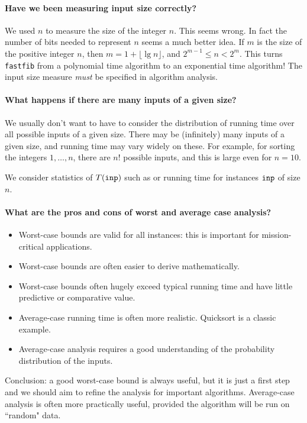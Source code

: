 \paragraph{Have we been measuring input size correctly?}

We used $n$ to measure the size of the integer $n$. This seems wrong. In fact the number of bits needed to represent $n$ seems a much better 
idea. If $m$ is the size of the positive integer $n$, then $m = 1+\lfloor\lg n\rfloor$, and $2^{m-1} \leq n < 2^m$.
This turns \texttt{fastfib} from a polynomial time algorithm to an exponential time algorithm! The input size measure \emph{must} be specified in algorithm analysis.



\paragraph{What happens if there are many inputs of a given size?}

We usually don't want to have to consider the distribution of
running time over all possible inputs of a given size. There may be (infinitely)
many inputs of a given size, and running time may vary widely on these. 
For example, for sorting the integers $1, \dots, n$, there are $n!$ possible inputs, and this is large even for $n=10$.

We consider statistics of $T(\operatorname{\text{\texttt{inp}}})$ such as   or 
 running time for instances $\operatorname{\text{\texttt{inp}}}$ of size $n$.


\paragraph{What are the pros and cons of worst and average case analysis?}
\begin{itemize}
\item Worst-case bounds are valid for all instances: 
this is important for mission-critical applications.
\item Worst-case bounds are often easier to derive mathematically.
\item Worst-case bounds often hugely exceed typical running time and 
have little predictive or comparative value. 
\item Average-case running time is often more realistic. Quicksort is a classic 
example.
\item Average-case analysis requires a good understanding of the probability 
distribution of the inputs.
\end{itemize}
Conclusion: a good worst-case bound is always useful, but it is
just a first step and we should aim to refine the analysis for important 
algorithms. Average-case analysis is often more practically useful, provided the
 algorithm will be run on ``random" data. 

